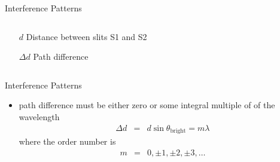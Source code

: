 \begin{frame}{Interference Patterns}
    \vspace{-1cm}
    \begin{columns}[c, onlytextwidth]
        \begin{column}{0.5\textwidth}
            \begin{itemize}
                \item[$d$] Distance between slits S1 and S2
                \item[$\Delta d$] Path difference
            \end{itemize}
        \end{column}
    \end{columns}

\end{frame}

\begin{frame}[c]{Interference Patterns}
    \begin{itemize}
        \item {} path difference must be either zero or some integral multiple of of the wavelength
              \begin{eqnarray*}
                  \Delta d &=& d\sin\theta_{\text{bright}}= m\lambda
              \end{eqnarray*}
              where the order number is
              \begin{eqnarray*}
                  m &=& 0,\pm 1, \pm 2, \pm 3,\ldots
              \end{eqnarray*}
    \end{itemize}
\end{frame}

